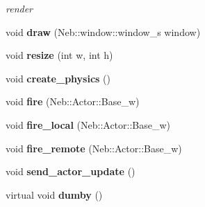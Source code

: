 \begin{DoxyCompactItemize}
\begin{DoxyCompactList}\small\item\em render \end{DoxyCompactList}\item 
\hypertarget{classNeb_1_1Scene_1_1Base_abd100e2883655480ce6e08c2124a1df0}{void {\bfseries draw} (\-Neb\-::window\-::window\-\_\-s window)}\label{classNeb_1_1Scene_1_1Base_abd100e2883655480ce6e08c2124a1df0}

\item 
\hypertarget{classNeb_1_1Scene_1_1Base_a9b1fbc5ffb04397abf8dc938544c5470}{void {\bfseries resize} (int w, int h)}\label{classNeb_1_1Scene_1_1Base_a9b1fbc5ffb04397abf8dc938544c5470}

\item 
\hypertarget{classNeb_1_1Scene_1_1Base_a876e6ed9b1f7d461f413b3530bf5c3fe}{void {\bfseries create\-\_\-physics} ()}\label{classNeb_1_1Scene_1_1Base_a876e6ed9b1f7d461f413b3530bf5c3fe}

\item 
\hypertarget{classNeb_1_1Scene_1_1Base_aa44ae1c399f8e3c38c39d76fcd687b76}{void {\bfseries fire} (\-Neb\-::\-Actor\-::\-Base\-\_\-w)}\label{classNeb_1_1Scene_1_1Base_aa44ae1c399f8e3c38c39d76fcd687b76}

\item 
\hypertarget{classNeb_1_1Scene_1_1Base_a63f9ef79ba12301f812ad7dd0fba8c6d}{void {\bfseries fire\-\_\-local} (\-Neb\-::\-Actor\-::\-Base\-\_\-w)}\label{classNeb_1_1Scene_1_1Base_a63f9ef79ba12301f812ad7dd0fba8c6d}

\item 
\hypertarget{classNeb_1_1Scene_1_1Base_ab000ef3d0fe819d74830cd1deaac9d67}{void {\bfseries fire\-\_\-remote} (\-Neb\-::\-Actor\-::\-Base\-\_\-w)}\label{classNeb_1_1Scene_1_1Base_ab000ef3d0fe819d74830cd1deaac9d67}

\item 
\hypertarget{classNeb_1_1Scene_1_1Base_a5525752576bf458b659eecb09be4250e}{void {\bfseries send\-\_\-actor\-\_\-update} ()}\label{classNeb_1_1Scene_1_1Base_a5525752576bf458b659eecb09be4250e}

\item 
\hypertarget{classNeb_1_1Scene_1_1Base_a508f9d9c313e3047c9bc0eaa06402620}{virtual void {\bfseries dumby} ()}\label{classNeb_1_1Scene_1_1Base_a508f9d9c313e3047c9bc0eaa06402620}

\end{DoxyCompactItemize}
